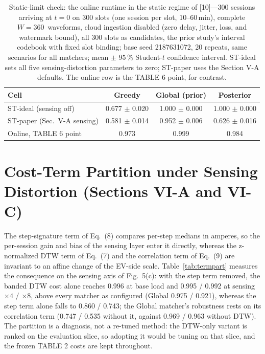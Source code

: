\documentclass[10pt]{article}
\newcommand{\sq}{\,\text{s}}
\begin{document}
\begin{table}[h]
\centering
\caption{Static-limit check: the online runtime in the static regime of [10]---300 sessions arriving at $t = 0$ on 300 slots (one session per slot, 10--60\,min), complete $W = 360$\sq{} waveforms, cloud ingestion disabled (zero delay, jitter, loss, and watermark bound), all 300 slots as candidates, the prior study's interval codebook with fixed slot binding; base seed 2187631072, 20 repeats, same scenarios for all matchers; mean $\pm$ 95\,\% Student-$t$ confidence interval. ST-ideal sets all five sensing-distortion parameters to zero; ST-paper uses the Section V-A defaults. The online row is the TABLE 6 point, for contrast.}
\label{tab:static}
\small
\begin{tabular}{@{}lccc@{}}
\toprule
\textbf{Cell} & \textbf{Greedy} & \textbf{Global (prior)} & \textbf{Posterior} \\
\midrule
ST-ideal (sensing off) & 0.677 $\pm$ 0.020 & 1.000 $\pm$ 0.000 & 1.000 $\pm$ 0.000 \\
ST-paper (Sec.~V-A sensing) & 0.581 $\pm$ 0.014 & 0.952 $\pm$ 0.006 & 0.626 $\pm$ 0.016 \\
Online, TABLE 6 point & 0.973 & 0.999 & 0.984 \\
\bottomrule
\end{tabular}
\end{table}

\section{Cost-Term Partition under Sensing Distortion (Sections VI-A and VI-C)}

The step-signature term of Eq.~(8) compares per-step medians in amperes, so the per-session gain and bias of the sensing layer enter it directly, whereas the z-normalized DTW term of Eq.~(7) and the correlation term of Eq.~(9) are invariant to an affine change of the EV-side scale. Table~\ref{tab:termpart} measures the consequence on the sensing axis of Fig.~5(c): with the step term removed, the banded DTW cost alone reaches 0.996 at base load and 0.995 / 0.992 at sensing $\times 4$ / $\times 8$, above every matcher as configured (Global 0.975 / 0.921), whereas the step term alone falls to 0.860 / 0.743; the Global matcher's robustness rests on its correlation term (0.747 / 0.535 without it, against 0.969 / 0.963 without DTW). The partition is a diagnosis, not a re-tuned method: the DTW-only variant is ranked on the evaluation slice, so adopting it would be tuning on that slice, and the frozen TABLE 2 costs are kept throughout.
\end{document}
